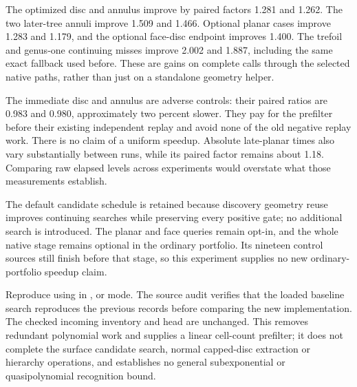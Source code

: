 The optimized disc and annulus improve by paired factors 1.281 and 1.262.
The two later-tree annuli improve 1.509 and 1.466. Optional planar cases
improve 1.283 and 1.179, and the optional face-disc endpoint improves 1.400.
The trefoil and genus-one continuing misses improve 2.002 and 1.887,
including the same exact fallback used before. These are gains on complete
calls through the selected native paths, rather than just on a standalone
geometry helper.

The immediate disc and annulus are adverse controls: their paired ratios
are 0.983 and 0.980, approximately two percent slower. They pay for the
prefilter before their existing independent replay and avoid none of the
old negative replay work. There is no claim of a uniform speedup. Absolute
late-planar times also vary substantially between runs, while its paired
factor remains about 1.18. Comparing raw elapsed levels across experiments
would overstate what those measurements establish.

The default candidate schedule is retained because discovery geometry
reuse improves continuing searches while preserving every positive gate;
no additional search is introduced. The planar and face queries remain
opt-in, and the whole native stage remains optional in the ordinary
portfolio. Its nineteen control sources still finish before that stage,
so this experiment supplies no new ordinary-portfolio speedup claim.

Reproduce using  in
,  or  mode. The
source audit verifies that the loaded baseline search reproduces the
previous records before comparing the new implementation. The checked
incoming inventory and  head  are
unchanged. This removes redundant polynomial work and supplies a linear
cell-count prefilter; it does not complete the surface candidate search,
normal capped-disc extraction or hierarchy operations, and establishes no
general subexponential or quasipolynomial recognition bound.
